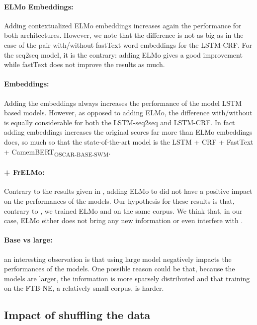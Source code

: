 \paragraph{ELMo Embeddings:} Adding contextualized ELMo embeddings increases again the performance for both architectures. However, we note that the difference is not as big as in the case of the pair with/without fastText word embeddings for the LSTM-CRF. For the seq2seq model, it is the contrary: adding ELMo gives a good improvement while fastText does not improve the results as much.

\paragraph{\camembert Embeddings:} Adding the \camembert embeddings always increases the performance of the model LSTM based models. However, as opposed to adding ELMo, the difference with/without \camembert is equally considerable for both the LSTM-seq2seq and LSTM-CRF. In fact adding \camembert embeddings increases the original scores far more than ELMo embeddings does, so much so that the state-of-the-art model is the LSTM + CRF + FastText + CamemBERT\textsubscript{OSCAR-BASE-SWM}.

\paragraph{\camembert + FrELMo:} Contrary to the results given in \citet{strakova-etal-2019-neural}, adding ELMo to \camembert did not have a positive impact on the performances of the models. Our hypothesis for these results is that, contrary to \citet{strakova-etal-2019-neural}, we trained ELMo and \camembert on the same corpus. We think that, in our case, ELMo either does not bring any new information or even interfere with \camembert.

\paragraph{Base vs large:} an interesting observation is that using large model negatively impacts the performances of the models. One possible reason could be that, because the models are larger, the information is more sparsely distributed and that training on the FTB-NE, a relatively small corpus, is harder.

\subsection{Impact of shuffling the data}
\label{subsubsec:shuffling}

